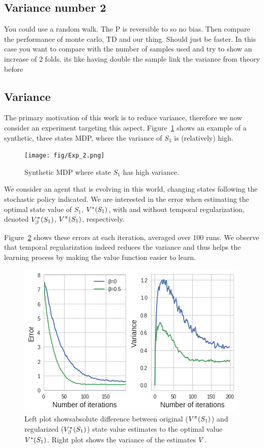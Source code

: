 \subsection{Variance number 2}
You could use a random walk. The P is reversible to so no bias. Then compare the performance of monte carlo, TD and our thing. Should just be faster. In this case you want to compare with the number of samples used and try to show an increase of 2 folds. its like having double the sample link the variance from theory before

\subsection{Variance}
\label{sec:expe:variance}
The primary motivation of this work is to reduce variance, therefore we now consider an experiment  targeting this aspect. Figure~\ref{fig:MDP} shows an example of a synthetic, three states MDP, where the variance of $S_1$ is (relatively) high.
\begin{figure}
    \centering
    \texttt{[image: fig/Exp\_2.png]}
    \caption{Synthetic MDP where state $S_1$ has high variance.}
    \label{fig:MDP}
\end{figure}
We consider an agent that is evolving in this world, changing states following the stochastic policy indicated. We are interested in the error when estimating the optimal state value of $S_1$, $V^*(S_1)$, with and without temporal regularization, denoted $V_{\beta}^{\pi}(S_1)$, $V^{\pi}(S_1)$, respectively.

Figure~\ref{fig:perf_MDP} shows these errors at each iteration, averaged over $100$ runs. We observe that temporal regularization indeed reduces the variance and thus helps the learning process by making the value function easier to learn.
\begin{figure}
    \centering
    \includegraphics[scale=0.7]{fig/exp_2_result.png}
    \caption{Left plot showsabsolute difference between original ($V^{\pi}(S_1)$) and regularized ($V_{\beta}^{\pi}(S_1)$) state value estimates to the optimal value $V^*(S_1)$. Right plot shows the variance of the estimates $V$.}
    \label{fig:perf_MDP}
\end{figure}

